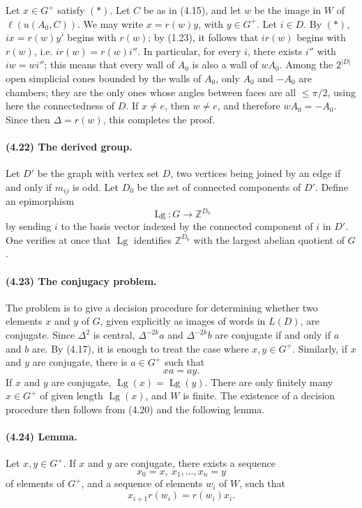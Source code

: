 \documentclass[10pt]{article}
\newcommand{\Z}{\mathbb Z}
\begin{document}
Let \(x\in G^+\) satisfy \((*)\). Let \(C\) be as in (4.15), and let \(w\) be the image in \(W\) of \(\ell(u(A_0,C))\). We may write \(x=r(w)y\), with \(y\in G^+\). Let \(i\in D\). By \((*)\), \(ix=r(w)y'\) begins with \(r(w)\); by (1.23), it follows that \(ir(w)\) begins with \(r(w)\), i.e. \(ir(w)=r(w)i''\). In particular, for every \(i\), there exists \(i''\) with \(iw=wi''\); this means that every wall of \(A_0\) is also a wall of \(wA_0\). Among the \(2^{|D|}\) open simplicial cones bounded by the walls of \(A_0\), only \(A_0\) and \(-A_0\) are chambers; they are the only ones whose angles between faces are all \(\le\pi/2\), using here the connectedness of \(D\). If \(x\ne e\), then \(w\ne e\), and therefore \(wA_0=-A_0\). Since then \(\Delta=r(w)\), this completes the proof.

\paragraph{(4.22) The derived group.} Let \(D'\) be the graph with vertex set \(D\), two vertices being joined by an edge if and only if \(m_{ij}\) is odd. Let \(D_0\) be the set of connected components of \(D'\). Define an epimorphism
\[
\operatorname{Lg}:G\longrightarrow\Z^{D_0}
\]
by sending \(i\) to the basis vector indexed by the connected component of \(i\) in \(D'\). One verifies at once that \(\operatorname{Lg}\) identifies \(\Z^{D_0}\) with the largest abelian quotient of \(G\).

\paragraph{(4.23) The conjugacy problem.} The problem is to give a decision procedure for determining whether two elements \(x\) and \(y\) of \(G\), given explicitly as images of words in \(L(D)\), are conjugate. Since \(\Delta^2\) is central, \(\Delta^{-2k}a\) and \(\Delta^{-2k}b\) are conjugate if and only if \(a\) and \(b\) are. By (4.17), it is enough to treat the case where \(x,y\in G^+\). Similarly, if \(x\) and \(y\) are conjugate, there is \(a\in G^+\) such that
\[
xa=ay.
\]
If \(x\) and \(y\) are conjugate, \(\operatorname{Lg}(x)=\operatorname{Lg}(y)\). There are only finitely many \(x\in G^+\) of given length \(\operatorname{Lg}(x)\), and \(W\) is finite. The existence of a decision procedure then follows from (4.20) and the following lemma.

\paragraph{(4.24) Lemma.} Let \(x,y\in G^+\). If \(x\) and \(y\) are conjugate, there exists a sequence
\[
x_0=x,\ x_1,\ldots,x_n=y
\]
of elements of \(G^+\), and a sequence of elements \(w_i\) of \(W\), such that
\[
x_{i+1}r(w_i)=r(w_i)x_i.
\]
\end{document}
